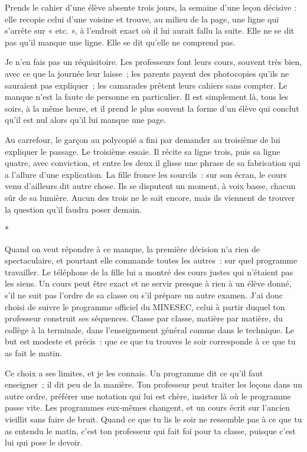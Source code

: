 \documentclass[10.5pt,twoside,openright]{book}
\newcommand{\asterisme}{\par\vspace{0.7em}\centerline{\color{gris}*\quad*\quad*}\vspace{0.7em}\par\noindent}
\begin{document}
Prends le cahier d’une élève absente trois jours, la semaine d’une leçon décisive : elle recopie celui d’une voisine et trouve, au milieu de la page, une ligne qui s’arrête sur « etc. », à l’endroit exact où il lui aurait fallu la suite. Elle ne se dit pas qu’il manque une ligne. Elle se dit qu’elle ne comprend pas.

Je n’en fais pas un réquisitoire. Les professeurs font leurs cours, souvent très bien, avec ce que la journée leur laisse ; les parents payent des photocopies qu’ils ne sauraient pas expliquer ; les camarades prêtent leurs cahiers sans compter. Le manque n’est la faute de personne en particulier. Il est simplement là, tous les soirs, à la même heure, et il prend le plus souvent la forme d’un élève qui conclut qu’il est nul alors qu’il lui manque une page.

Au carrefour, le garçon au polycopié a fini par demander au troisième de lui expliquer le passage. Le troisième essaie. Il récite sa ligne trois, puis sa ligne quatre, avec conviction, et entre les deux il glisse une phrase de sa fabrication qui a l’allure d’une explication. La fille fronce les sourcils : sur son écran, le cours venu d’ailleurs dit autre chose. Ils se disputent un moment, à voix basse, chacun sûr de sa lumière. Aucun des trois ne le sait encore, mais ils viennent de trouver la question qu’il faudra poser demain.

\asterisme

Quand on veut répondre à ce manque, la première décision n’a rien de spectaculaire, et pourtant elle commande toutes les autres : sur quel programme travailler. Le téléphone de la fille lui a montré des cours justes qui n’étaient pas les siens. Un cours peut être exact et ne servir presque à rien à un élève donné, s’il ne suit pas l’ordre de sa classe ou s’il prépare un autre examen. J’ai donc choisi de suivre le programme officiel du MINESEC, celui à partir duquel ton professeur construit ses séquences. Classe par classe, matière par matière, du collège à la terminale, dans l’enseignement général comme dans le technique. Le but est modeste et précis : que ce que tu trouves le soir corresponde à ce que tu as fait le matin.

Ce choix a ses limites, et je les connais. Un programme dit ce qu’il faut enseigner ; il dit peu de la manière. Ton professeur peut traiter les leçons dans un autre ordre, préférer une notation qui lui est chère, insister là où le programme passe vite. Les programmes eux-mêmes changent, et un cours écrit sur l’ancien vieillit sans faire de bruit. Quand ce que tu lis le soir ne ressemble pas à ce que tu as entendu le matin, c’est ton professeur qui fait foi pour ta classe, puisque c’est lui qui pose le devoir.
\end{document}
